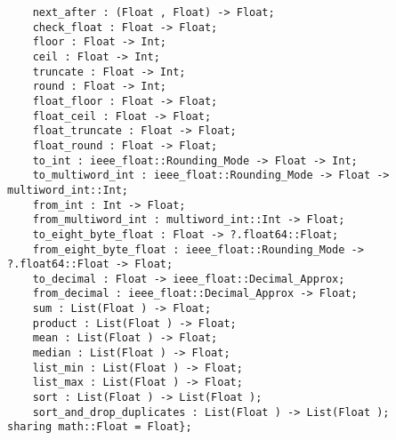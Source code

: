 \begin{verbatim}
    next_after : (Float , Float) -> Float;
    check_float : Float -> Float;
    floor : Float -> Int;
    ceil : Float -> Int;
    truncate : Float -> Int;
    round : Float -> Int;
    float_floor : Float -> Float;
    float_ceil : Float -> Float;
    float_truncate : Float -> Float;
    float_round : Float -> Float;
    to_int : ieee_float::Rounding_Mode -> Float -> Int;
    to_multiword_int : ieee_float::Rounding_Mode -> Float -> multiword_int::Int;
    from_int : Int -> Float;
    from_multiword_int : multiword_int::Int -> Float;
    to_eight_byte_float : Float -> ?.float64::Float;
    from_eight_byte_float : ieee_float::Rounding_Mode -> ?.float64::Float -> Float;
    to_decimal : Float -> ieee_float::Decimal_Approx;
    from_decimal : ieee_float::Decimal_Approx -> Float;
    sum : List(Float ) -> Float;
    product : List(Float ) -> Float;
    mean : List(Float ) -> Float;
    median : List(Float ) -> Float;
    list_min : List(Float ) -> Float;
    list_max : List(Float ) -> Float;
    sort : List(Float ) -> List(Float );
    sort_and_drop_duplicates : List(Float ) -> List(Float );
sharing math::Float = Float};
\end{verbatim}
\index[fun]{====}
\index[fun]{>=}
\index[fun]{>}
\index[fun]{<=}
\index[fun]{<}
\index[fun]{-\_}
\index[fun]{*-}
\index[fun]{*+}
\index[fun]{/}
\index[fun]{*}
\index[fun]{-}
\index[fun]{+}
\index[fun]{**}
